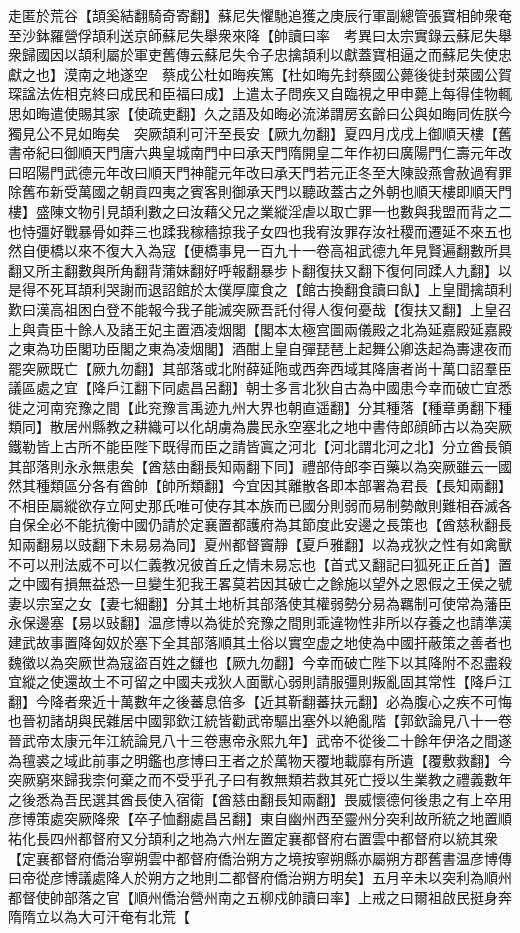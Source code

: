 走匿於荒谷【頡奚結翻騎奇寄翻】蘇尼失懼馳追獲之庚辰行軍副總管張寶相帥衆奄至沙鉢羅營俘頡利送京師蘇尼失舉衆來降【帥讀曰率　考異曰太宗實錄云蘇尼失舉衆歸國因以頡利屬於軍吏舊傳云蘇尼失令子忠擒頡利以獻蓋寶相逼之而蘇尼失使忠獻之也】漠南之地遂空　蔡成公杜如晦疾篤【杜如晦先封蔡國公薨後徙封萊國公賀琛諡法佐相克終曰成民和臣福曰成】上遣太子問疾又自臨視之甲申薨上每得佳物輒思如晦遣使賜其家【使疏吏翻】久之語及如晦必流涕謂房玄齡曰公與如晦同佐朕今獨見公不見如晦矣　突厥頡利可汗至長安【厥九勿翻】夏四月戊戌上御順天樓【舊書帝紀曰御順天門唐六典皇城南門中曰承天門隋開皇二年作初曰廣陽門仁壽元年改曰昭陽門武德元年改曰順天門神龍元年改曰承天門若元正冬至大陳設燕會赦過宥罪除舊布新受萬國之朝貢四夷之賓客則御承天門以聽政蓋古之外朝也順天樓即順天門樓】盛陳文物引見頡利數之曰汝藉父兄之業縱淫虐以取亡罪一也數與我盟而背之二也恃彊好戰暴骨如莽三也蹂我稼穡掠我子女四也我宥汝罪存汝社稷而遷延不來五也然自便橋以來不復大入為寇【便橋事見一百九十一卷高祖武德九年見賢遍翻數所具翻又所主翻數與所角翻背蒲妹翻好呼報翻暴步卜翻復扶又翻下復何同蹂人九翻】以是得不死耳頡利哭謝而退詔館於太僕厚廩食之【館古換翻食讀曰飤】上皇聞擒頡利歎曰漢高祖困白登不能報今我子能滅突厥吾託付得人復何憂哉【復扶又翻】上皇召上與貴臣十餘人及諸王妃主置酒凌烟閣【閣本太極宫圖兩儀殿之北為延嘉殿延嘉殿之東為功臣閣功臣閣之東為凌烟閣】酒酣上皇自彈琵琶上起舞公卿迭起為夀逮夜而罷突厥既亡【厥九勿翻】其部落或北附薛延陁或西奔西域其降唐者尚十萬口詔羣臣議區處之宜【降戶江翻下同處昌呂翻】朝士多言北狄自古為中國患今幸而破亡宜悉徙之河南兖豫之間【此兖豫言禹迹九州大界也朝直遥翻】分其種落【種章勇翻下種類同】散居州縣教之耕織可以化胡虜為農民永空塞北之地中書侍郎顔師古以為突厥鐵勒皆上古所不能臣陛下既得而臣之請皆寘之河北【河北謂北河之北】分立酋長領其部落則永永無患矣【酋慈由翻長知兩翻下同】禮部侍郎李百藥以為突厥雖云一國然其種類區分各有酋帥【帥所類翻】今宜因其離散各即本部署為君長【長知兩翻】不相臣屬縱欲存立阿史那氏唯可使存其本族而已國分則弱而易制勢敵則難相吞滅各自保全必不能抗衡中國仍請於定襄置都護府為其節度此安邊之長策也【酋慈秋翻長知兩翻易以豉翻下未易易為同】夏州都督竇靜【夏戶雅翻】以為戎狄之性有如禽獸不可以刑法威不可以仁義教况彼首丘之情未易忘也【首式又翻記曰狐死正丘首】置之中國有損無益恐一旦變生犯我王畧莫若因其破亡之餘施以望外之恩假之王侯之號妻以宗室之女【妻七細翻】分其土地析其部落使其權弱勢分易為羈制可使常為藩臣永保邊塞【易以䜴翻】温彦博以為徙於兖豫之間則乖違物性非所以存養之也請準漢建武故事置降匈奴於塞下全其部落順其土俗以實空虚之地使為中國扞蔽策之善者也魏徵以為突厥世為寇盜百姓之讎也【厥九勿翻】今幸而破亡陛下以其降附不忍盡殺宜縱之使還故土不可留之中國夫戎狄人面獸心弱則請服彊則叛亂固其常性【降戶江翻】今降者衆近十萬數年之後蕃息倍多【近其靳翻蕃扶元翻】必為腹心之疾不可悔也晉初諸胡與民雜居中國郭欽江統皆勸武帝驅出塞外以絶亂階【郭欽論見八十一卷晉武帝太康元年江統論見八十三卷惠帝永熙九年】武帝不從後二十餘年伊洛之間遂為氊裘之域此前事之明鑑也彦博曰王者之於萬物天覆地載靡有所遺【覆敷救翻】今突厥窮來歸我柰何棄之而不受乎孔子曰有教無類若救其死亡授以生業教之禮義數年之後悉為吾民選其酋長使入宿衛【酋慈由翻長知兩翻】畏威懷德何後患之有上卒用彦博策處突厥降衆【卒子恤翻處昌呂翻】東自幽州西至靈州分突利故所統之地置順祐化長四州都督府又分頡利之地為六州左置定襄都督府右置雲中都督府以統其衆【定襄都督府僑治寧朔雲中都督府僑治朔方之境按寧朔縣亦屬朔方郡舊書温彦博傳曰帝從彦博議處降人於朔方之地則二都督府僑治朔方明矣】五月辛未以突利為順州都督使帥部落之官【順州僑治營州南之五柳戍帥讀曰率】上戒之曰爾祖啟民挺身奔隋隋立以為大可汗奄有北荒【
